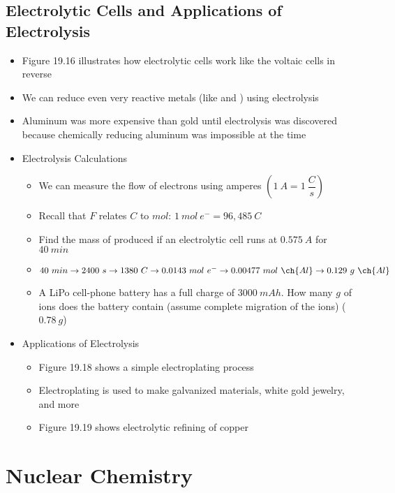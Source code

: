 \documentclass[12pt, openany, letterpaper]{memoir}
\begin{document}
\section{Electrolytic Cells and Applications of Electrolysis}
\begin{itemize}
	\item Figure 19.16 illustrates how electrolytic cells work like the voltaic cells in reverse
	\item We can reduce even very reactive metals (like  and ) using electrolysis
	\item Aluminum was more expensive than gold until electrolysis was discovered because chemically reducing aluminum was impossible at the time
	\item Electrolysis Calculations
	\begin{itemize}
		\item We can measure the flow of electrons using amperes $\left(1~A = 1~\dfrac{C}{s}\right)$
		\item Recall that $F$ relates $C$ to $mol$: $1~mol~e^-=96,485~C$
		\item Find the mass of  produced if an electrolytic cell runs at $0.575~A$ for $40~min$
		\item $40~min \rightarrow 2400~s \rightarrow 	1380~C \rightarrow 	0.0143~mol~e^- \rightarrow 0.00477~mol~\ch{Al}\rightarrow 0.129~g~\ch{Al}$
		\item A LiPo cell-phone battery has a full charge of $3000~mAh$. How many $g$ of  ions does the battery contain (assume complete migration of the ions) ($0.78~g$)
	\end{itemize}
	\item Applications of Electrolysis
	\begin{itemize}
		\item Figure 19.18 shows a simple electroplating process
		\item Electroplating is used to make galvanized materials, white gold jewelry, and more
		\item Figure 19.19 shows electrolytic refining of copper
	\end{itemize}
\end{itemize}

\chapter{Nuclear Chemistry}
\end{document}
